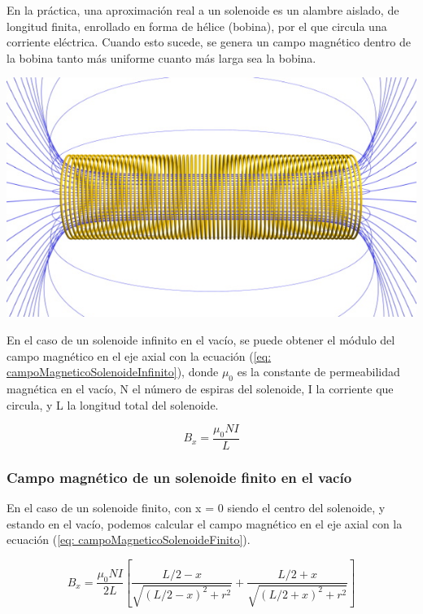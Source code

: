 \documentclass[a4paper,12pt]{article}
\newenvironment{Figure}
    {\par\medskip\noindent\minipage{\linewidth}}
    {\endminipage\par\medskip}
\begin{document}
        En la práctica, una aproximación real a un solenoide es un alambre aislado, de longitud finita, enrollado en forma de hélice (bobina), por el que circula una corriente eléctrica. Cuando esto sucede, se genera un campo magnético dentro de la bobina tanto más uniforme cuanto más larga sea la bobina.

        \begin{Figure}
            \centering

            \includegraphics[width=0.6\linewidth]{Solenoide.jpg}
            \label{fig: solenoide}
        \end{Figure}

        En el caso de un solenoide infinito en el vacío, se puede obtener el módulo del campo magnético en el eje axial con la ecuación (\ref{eq: campoMagneticoSolenoideInfinito}), donde $\mu_0$ es la constante de permeabilidad magnética en el vacío, N el número de espiras del solenoide, I la corriente que circula, y L la longitud total del solenoide.

        \begin{equation}
            \label{eq: campoMagneticoSolenoideInfinito}
            B_x = \frac{\mu_0 N I}{L}
        \end{equation}

    \subsubsection*{Campo magnético de un solenoide finito en el vacío}
    
        En el caso de un solenoide finito, con x = 0 siendo el centro del solenoide, y estando en el vacío, podemos calcular el campo magnético en el eje axial con la ecuación (\ref{eq: campoMagneticoSolenoideFinito}).

        \begin{equation}
            \label{eq: campoMagneticoSolenoideFinito}
            B_x = \frac{\mu_0 N I}{2L} \left[ \frac{L/2 - x}{\sqrt{(L/2 - x)^2 + r^2}} + \frac{L/2 + x}{\sqrt{(L/2 + x)^2 + r^2}} \right]
        \end{equation}
\end{document}

